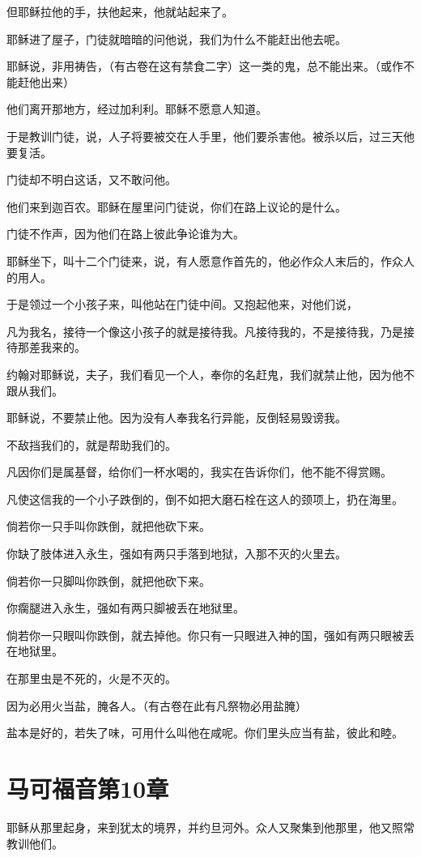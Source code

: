 \documentclass[12pt,oneside]{book}
\begin{document}
但耶稣拉他的手，扶他起来，他就站起来了。

耶稣进了屋子，门徒就暗暗的问他说，我们为什么不能赶出他去呢。

耶稣说，非用祷告，（有古卷在这有禁食二字）这一类的鬼，总不能出来。（或作不能赶他出来）

他们离开那地方，经过加利利。耶稣不愿意人知道。

于是教训门徒，说，人子将要被交在人手里，他们要杀害他。被杀以后，过三天他要复活。

门徒却不明白这话，又不敢问他。

他们来到迦百农。耶稣在屋里问门徒说，你们在路上议论的是什么。

门徒不作声，因为他们在路上彼此争论谁为大。

耶稣坐下，叫十二个门徒来，说，有人愿意作首先的，他必作众人末后的，作众人的用人。

于是领过一个小孩子来，叫他站在门徒中间。又抱起他来，对他们说，

凡为我名，接待一个像这小孩子的就是接待我。凡接待我的，不是接待我，乃是接待那差我来的。

约翰对耶稣说，夫子，我们看见一个人，奉你的名赶鬼，我们就禁止他，因为他不跟从我们。

耶稣说，不要禁止他。因为没有人奉我名行异能，反倒轻易毁谤我。

不敌挡我们的，就是帮助我们的。

凡因你们是属基督，给你们一杯水喝的，我实在告诉你们，他不能不得赏赐。

凡使这信我的一个小子跌倒的，倒不如把大磨石栓在这人的颈项上，扔在海里。

倘若你一只手叫你跌倒，就把他砍下来。

你缺了肢体进入永生，强如有两只手落到地狱，入那不灭的火里去。

倘若你一只脚叫你跌倒，就把他砍下来。

你瘸腿进入永生，强如有两只脚被丢在地狱里。

倘若你一只眼叫你跌倒，就去掉他。你只有一只眼进入神的国，强如有两只眼被丢在地狱里。

在那里虫是不死的，火是不灭的。

因为必用火当盐，腌各人。（有古卷在此有凡祭物必用盐腌）

盐本是好的，若失了味，可用什么叫他在咸呢。你们里头应当有盐，彼此和睦。

\chapter{马可福音第10章}
耶稣从那里起身，来到犹太的境界，并约旦河外。众人又聚集到他那里，他又照常教训他们。
\end{document}
